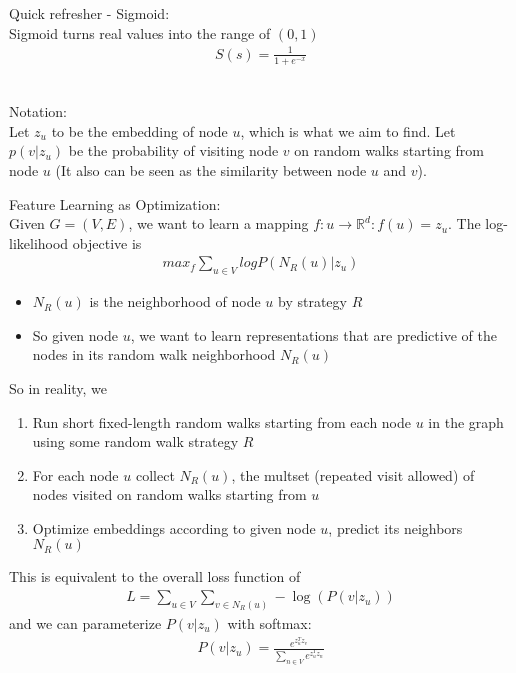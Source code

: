 Quick refresher - Sigmoid: \\
Sigmoid turns real values into the range of $(0,1)$
    \begin{align*}
        S(s) = \frac{1}{1 + e^{-x}}
    \end{align*}
\\ \par

Notation: \\
Let $z_u$ to be the embedding of node $u$, which is what we aim to find. Let $p(v|z_u)$ be the probability of visiting node $v$ on random walks starting from node $u$ (It also can be seen as the similarity between node $u$ and $v$). 
\\ \par



Feature Learning as Optimization: \\
Given $G=(V,E)$, we want to learn a mapping $f:u \rightarrow \mathbb{R}^d:f(u)=z_u$. The log-likelihood objective is 
    \begin{align*}
        max_f\sum_{u\in V} log P(N_R(u)|z_u)
    \end{align*}
    \begin{itemize}
        \item $N_R(u)$ is the neighborhood of node $u$ by strategy $R$
        \item So given node $u$, we want to learn representations that are predictive of the nodes in its random walk neighborhood $N_R(u)$
    \end{itemize}
So in reality, we 
    \begin{enumerate}
        \item Run short fixed-length random walks starting from each node $u$ in the graph using some random walk strategy $R$
        \item For each node $u$ collect $N_R(u)$, the multset (repeated visit allowed)  of nodes visited on random walks starting from $u$
        \item Optimize embeddings according to given node $u$, predict its neighbors $N_R(u)$
    \end{enumerate}
This is equivalent to the overall loss function of 
    \begin{align*}
        L = \sum_{u\in V}\sum_{v\in N_R(u)} - \log (P(v|z_u))
    \end{align*}
and we can parameterize $P(v|z_u)$ with softmax: 
    \begin{align*}
        P(v|z_u) = \frac{e^{z_u^Tz_v}}{\sum_{n\in V} e^{z_u^Tz_n}}
    \end{align*}
